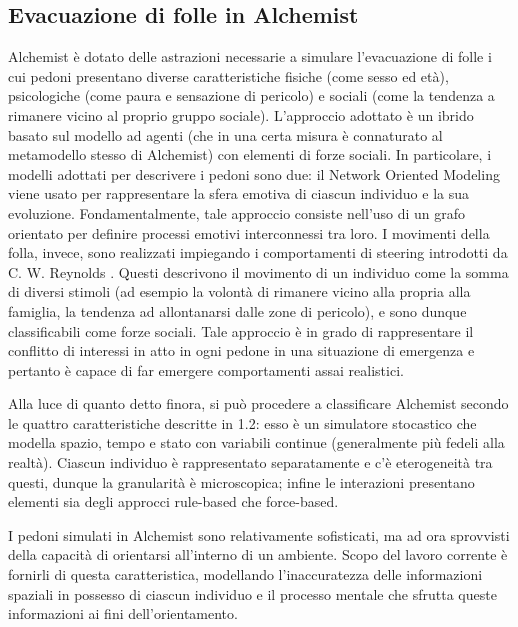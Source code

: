 \documentclass[12pt,a4paper,openright,oneside]{book}
\begin{document}
\subsection{Evacuazione di folle in Alchemist}
Alchemist è dotato delle astrazioni necessarie a simulare l'evacuazione di folle i cui pedoni presentano diverse caratteristiche fisiche (come sesso ed età), psicologiche (come paura e sensazione di pericolo) e sociali (come la tendenza a rimanere vicino al proprio gruppo sociale). L'approccio adottato è un ibrido basato sul modello ad agenti (che in una certa misura è connaturato al metamodello stesso di Alchemist) con elementi di forze sociali. In particolare, i modelli adottati per descrivere i pedoni sono due: il Network Oriented Modeling \cite{TreurNetworkOrientedModeling2018} viene usato per rappresentare la sfera emotiva di ciascun individuo e la sua evoluzione. Fondamentalmente, tale approccio consiste nell'uso di un grafo orientato per definire processi emotivi interconnessi tra loro. I movimenti della folla, invece, sono realizzati impiegando i comportamenti di steering introdotti da C. W. Reynolds \cite{ReynoldsSteering2002}. Questi descrivono il movimento di un individuo come la somma di diversi stimoli (ad esempio la volontà di rimanere vicino alla propria alla famiglia, la tendenza ad allontanarsi dalle zone di pericolo), e sono dunque classificabili come forze sociali. Tale approccio è in grado di rappresentare il conflitto di interessi in atto in ogni pedone in una situazione di emergenza e pertanto è capace di far emergere comportamenti assai realistici. 

Alla luce di quanto detto finora, si può procedere a classificare Alchemist secondo le quattro caratteristiche descritte in 1.2: esso è un simulatore stocastico che modella spazio, tempo e stato con variabili continue (generalmente più fedeli alla realtà). Ciascun individuo è rappresentato separatamente e c'è eterogeneità tra questi, dunque la granularità è microscopica; infine le interazioni presentano elementi sia degli approcci rule-based che force-based.

I pedoni simulati in Alchemist sono relativamente sofisticati, ma ad ora sprovvisti della capacità di orientarsi all'interno di un ambiente. Scopo del lavoro corrente è fornirli di questa caratteristica, modellando l'inaccuratezza delle informazioni spaziali in possesso di ciascun individuo e il processo mentale che sfrutta queste informazioni ai fini dell'orientamento.
\end{document}
